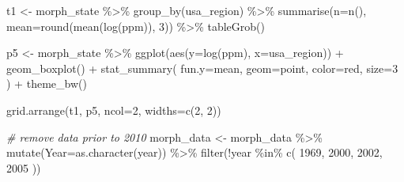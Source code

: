 \documentclass[
  11pt,
]{article}
\newenvironment{Shaded}{\begin{snugshade}}{\end{snugshade}}
\newcommand{\AttributeTok}[1]{\textcolor[rgb]{0.77,0.63,0.00}{#1}}
\newcommand{\CommentTok}[1]{\textcolor[rgb]{0.56,0.35,0.01}{\textit{#1}}}
\newcommand{\DecValTok}[1]{\textcolor[rgb]{0.00,0.00,0.81}{#1}}
\newcommand{\FunctionTok}[1]{\textcolor[rgb]{0.00,0.00,0.00}{#1}}
\newcommand{\NormalTok}[1]{#1}
\newcommand{\OtherTok}[1]{\textcolor[rgb]{0.56,0.35,0.01}{#1}}
\newcommand{\SpecialCharTok}[1]{\textcolor[rgb]{0.00,0.00,0.00}{#1}}
\newcommand{\StringTok}[1]{\textcolor[rgb]{0.31,0.60,0.02}{#1}}
\begin{document}
\begin{Shaded}
\begin{Highlighting}[]
\NormalTok{t1 }\OtherTok{\textless{}{-}}\NormalTok{ morph\_state }\SpecialCharTok{\%\textgreater{}\%}
  \FunctionTok{group\_by}\NormalTok{(usa\_region) }\SpecialCharTok{\%\textgreater{}\%}
  \FunctionTok{summarise}\NormalTok{(}\AttributeTok{n=}\FunctionTok{n}\NormalTok{(), }\AttributeTok{mean=}\FunctionTok{round}\NormalTok{(}\FunctionTok{mean}\NormalTok{(}\FunctionTok{log}\NormalTok{(ppm)), }\DecValTok{3}\NormalTok{)) }\SpecialCharTok{\%\textgreater{}\%}
  \FunctionTok{tableGrob}\NormalTok{()}

\NormalTok{p5 }\OtherTok{\textless{}{-}}\NormalTok{ morph\_state }\SpecialCharTok{\%\textgreater{}\%}
  \FunctionTok{ggplot}\NormalTok{(}\FunctionTok{aes}\NormalTok{(}\AttributeTok{y=}\FunctionTok{log}\NormalTok{(ppm), }\AttributeTok{x=}\NormalTok{usa\_region)) }\SpecialCharTok{+}
    \FunctionTok{geom\_boxplot}\NormalTok{() }\SpecialCharTok{+}
    \FunctionTok{stat\_summary}\NormalTok{(}
      \AttributeTok{fun.y=}\NormalTok{mean, }
      \AttributeTok{geom=}\StringTok{\textquotesingle{}point\textquotesingle{}}\NormalTok{,}
      \AttributeTok{color=}\StringTok{\textquotesingle{}red\textquotesingle{}}\NormalTok{,}
      \AttributeTok{size=}\DecValTok{3}
\NormalTok{    ) }\SpecialCharTok{+}
    \FunctionTok{theme\_bw}\NormalTok{()}

\FunctionTok{grid.arrange}\NormalTok{(t1, p5, }\AttributeTok{ncol=}\DecValTok{2}\NormalTok{, }\AttributeTok{widths=}\FunctionTok{c}\NormalTok{(}\DecValTok{2}\NormalTok{, }\DecValTok{2}\NormalTok{))}
\end{Highlighting}
\end{Shaded}

\begin{Shaded}
\end{Shaded}

\begin{Shaded}
\begin{Highlighting}[]
\CommentTok{\# remove data prior to 2010}
\NormalTok{morph\_data }\OtherTok{\textless{}{-}}\NormalTok{ morph\_data }\SpecialCharTok{\%\textgreater{}\%}
  \FunctionTok{mutate}\NormalTok{(}\AttributeTok{Year=}\FunctionTok{as.character}\NormalTok{(year)) }\SpecialCharTok{\%\textgreater{}\%}
  \FunctionTok{filter}\NormalTok{(}\SpecialCharTok{!}\NormalTok{year }\SpecialCharTok{\%in\%} \FunctionTok{c}\NormalTok{(}
    \DecValTok{1969}\NormalTok{, }\DecValTok{2000}\NormalTok{, }\DecValTok{2002}\NormalTok{, }\DecValTok{2005}
\NormalTok{  ))}
\end{Highlighting}
\end{Shaded}
\end{document}

